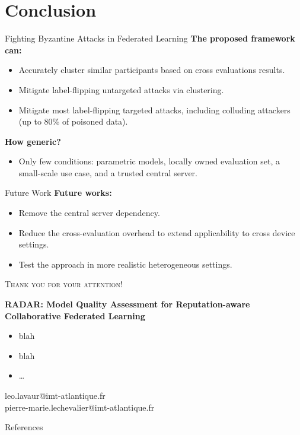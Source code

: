 \section*{Conclusion}

\begin{frame}
  \sectionpage
\end{frame}

\begin{frame}{Fighting Byzantine Attacks in Federated Learning}
  \textbf{The proposed framework can:}
  \begin{itemize}
    \item Accurately cluster similar participants based on cross evaluations results.
    \item Mitigate label-flipping untargeted attacks via clustering.
    \item Mitigate most label-flipping targeted attacks, including colluding attackers (up to 80\% of poisoned data).
  \end{itemize}

  \pause
  \textbf{How generic?}
  \begin{itemize}
    \item Only few conditions: parametric models, locally owned evaluation set, a \alert<3>{small-scale use case}, and a \alert<3>{trusted central server}.
  \end{itemize}
\end{frame}


\begin{frame}{Future Work}
  \textbf{Future works:}
    \begin{itemize}
      \item Remove the central server dependency.
      \item Reduce the cross-evaluation overhead to extend applicability to cross device settings.
      \item Test the approach in more realistic heterogeneous settings.
    \end{itemize}
\end{frame}


\begin{frame}
  \centering\scshape\large Thank you for your attention!

  \vfill
  
  \normalshape\normalsize

  \textbf{RADAR: Model Quality Assessment for Reputation-aware Collaborative Federated Learning}
  \medskip
  \raggedright
  \begin{itemize}
    \item blah
    \item blah
    \item \dots
  \end{itemize}

  \vfill

  \centering\small
  leo.lavaur@imt-atlantique.fr\\
  pierre-marie.lechevalier@imt-atlantique.fr

\end{frame}


\appendix

\begin{frame}[allowframebreaks]{References}
  \printbibliography[heading=none]
\end{frame}

